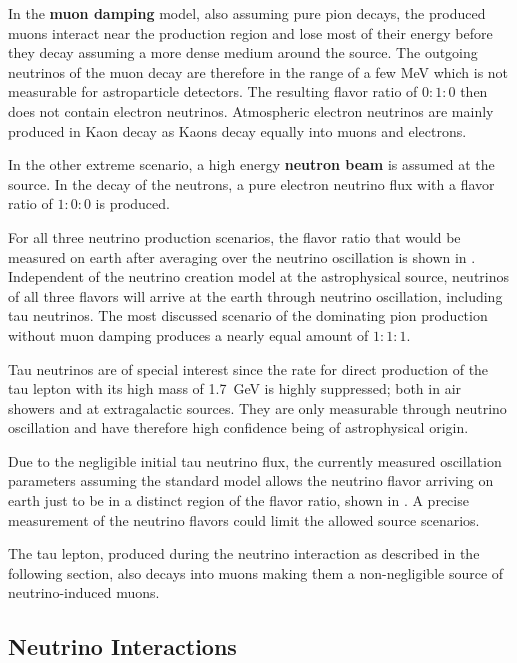 In the \textbf{muon damping} model, also assuming pure pion decays, the produced muons interact near the production region and lose most of their energy before they decay assuming a more dense medium around the source.
The outgoing neutrinos of the muon decay are therefore in the range of a few MeV which is not measurable for astroparticle detectors.
The resulting flavor ratio of $0:1:0$ then does not contain electron neutrinos.
Atmospheric electron neutrinos are mainly produced in Kaon decay as Kaons decay equally into muons and electrons.

In the other extreme scenario, a high energy \textbf{neutron beam} is assumed at the source.
In the decay of the neutrons, a pure electron neutrino flux with a flavor ratio of $1:0:0$ is produced.

For all three neutrino production scenarios, the flavor ratio that would be measured on earth after averaging over the neutrino oscillation is shown in .
Independent of the neutrino creation model at the astrophysical source, neutrinos of all three flavors will arrive at the earth through neutrino oscillation, including tau neutrinos.
The most discussed scenario of the dominating pion production without muon damping produces a nearly equal amount of $1:1:1$.

Tau neutrinos are of special interest since the rate for direct production of the tau lepton with its high mass of \SI{1.7}{GeV} is highly suppressed; both in air showers and at extragalactic sources.
They are only measurable through neutrino oscillation and have therefore high confidence being of astrophysical origin.

Due to the negligible initial tau neutrino flux, the currently measured oscillation parameters assuming the standard model allows the neutrino flavor arriving on earth just to be in a distinct region of the flavor ratio, shown in .
A precise measurement of the neutrino flavors could limit the allowed source scenarios.

The tau lepton, produced during the neutrino interaction as described in the following section, also decays into muons making them a non-negligible source of neutrino-induced muons.

\subsection{Neutrino Interactions}

